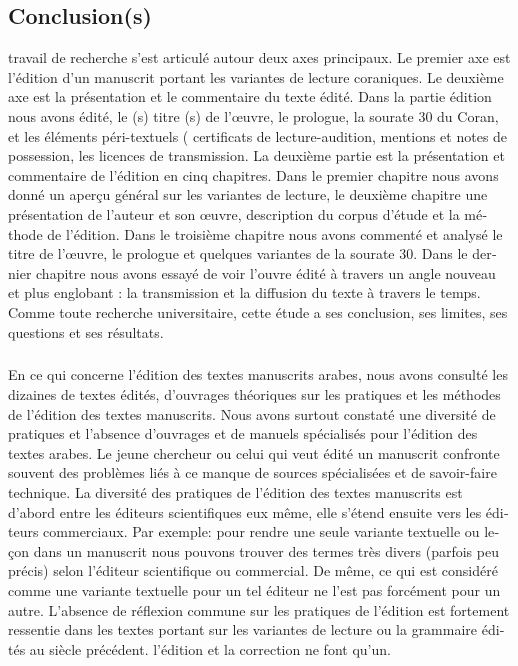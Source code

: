\documentclass[a4paper,12pt]{report}
\begin{document}
\begin{french}



\chapter*{Conclusion(s)}



 
 travail de recherche  s'est articulé autour deux axes principaux. Le premier axe est l'édition  d'un manuscrit portant les variantes de lecture coraniques. Le deuxième axe est la présentation et le commentaire du texte  édité. Dans la partie édition  nous avons édité, le (s) titre (s) de l'œuvre, le prologue,  la sourate 30 du Coran,  et les éléments péri-textuels  ( certificats de lecture-audition, mentions et notes de possession, les licences de transmission. La deuxième partie est la présentation et commentaire de l'édition en cinq chapitres.  Dans le premier chapitre nous avons donné un aperçu général  sur les variantes de lecture, le deuxième chapitre une présentation  de l'auteur et son œuvre, description du corpus d'étude et la méthode de l'édition. Dans le troisième chapitre nous avons commenté et analysé le titre de l'œuvre, le prologue et quelques variantes de la sourate 30. Dans le dernier chapitre nous avons essayé de voir l'ouvre  édité à travers un angle nouveau et plus englobant  : la transmission et la diffusion  du texte à travers le temps. Comme toute recherche universitaire, cette étude a ses conclusion, ses  limites, ses questions et ses résultats.  

\paragraph{}
En ce qui concerne l'édition des textes manuscrits arabes, 
nous avons consulté les dizaines  de textes édités, d'ouvrages théoriques sur  les pratiques et les méthodes de l'édition des textes manuscrits. Nous avons surtout constaté une diversité de pratiques et  l'absence d'ouvrages et de manuels spécialisés pour l'édition des textes arabes. Le  jeune chercheur ou celui qui veut édité un manuscrit  confronte souvent  des problèmes liés à ce manque de sources spécialisées et de savoir-faire technique. La diversité des pratiques de l'édition des textes manuscrits  est d'abord  entre les éditeurs scientifiques eux même, elle s'étend ensuite vers les éditeurs commerciaux. Par exemple: pour rendre une seule variante textuelle ou leçon dans un manuscrit  nous pouvons trouver des termes très divers (parfois peu précis) selon l'éditeur scientifique ou commercial. De même,  ce qui est considéré comme une variante textuelle pour un tel éditeur  ne l'est pas  forcément pour un autre.  
\newpage
L'absence de réflexion commune sur les pratiques de l'édition est fortement ressentie    dans les textes  portant sur les variantes de lecture ou la grammaire édités au siècle précédent. l'édition et la correction ne font qu'un. 



\end{french}
\end{document}
